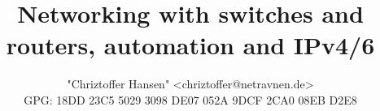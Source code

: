 \documentclass[a4paper,12pt,twoside,twocolumn,landscape]{book}
\title{Networking with switches and routers, automation and IPv4/6}
\author{"Chriztoffer Hansen" <chriztoffer@netravnen.de>\\
    GPG: 18DD 23C5 5029 3098 DE07  052A 9DCF 2CA0 08EB D2E8}
\begin{document}

\tableofcontents

\setlength{\parskip}{0.35em} %
\renewcommand{\baselinestretch}{1.15} %
















\clearpage
\printglossary[type=\acronymtype,title=Special Terms,toctitle=List of terms]


\renewcommand{\listfigurename}{List of {\footnotesize hidden} Figures}
\listoffigures


\renewcommand{\listtablename}{Tables {\footnotesize hidding} on the pages}
\listoftables




\end{document}
